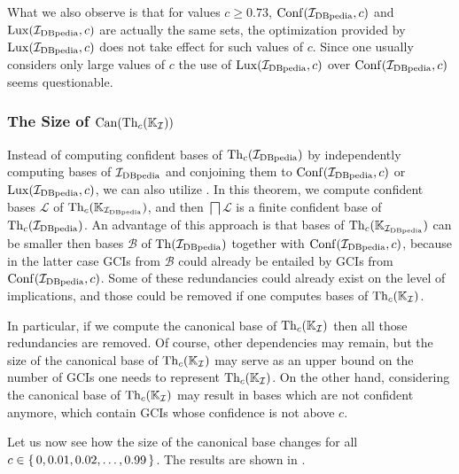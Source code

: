 What we also observe is that for values $c \geq 0.73$, $\operatorname{Conf}({\mathcal{I}_{\text{DBpedia}}}, c)$ and
$\operatorname{Lux}({\mathcal{I}_{\text{DBpedia}}}, c)$ are actually the same sets, \ie the optimization provided by
$\operatorname{Lux}({\mathcal{I}_{\text{DBpedia}}}, c)$ does not take effect for such values of $c$.  Since one usually
considers only large values of $c$ the use of $\operatorname{Lux}({\mathcal{I}_{\text{DBpedia}}}, c)$ over $\operatorname{Conf}({\mathcal{I}_{\text{DBpedia}}},
c)$ seems questionable.

\subsubsection{The Size of $\operatorname{Can}(\operatorname{Th}_c({\mathbb{K}}_{\mathcal{I}}))$}
\label{sec:size-canth_cc-k_math}

Instead of computing confident bases of $\operatorname{Th}_c({\mathcal{I}_{\text{DBpedia}}})$ by independently computing
bases of ${\mathcal{I}_{\text{DBpedia}}}$ and conjoining them to $\operatorname{Conf}({\mathcal{I}_{\text{DBpedia}}}, c)$ or $\operatorname{Lux}({\mathcal{I}_{\text{DBpedia}}}, c)$,
we can also utilize
.  In this theorem,
we compute confident bases $\mathcal{L}$ of $\operatorname{Th}_c({\mathbb{K}}_{{\mathcal{I}_{\text{DBpedia}}}})$, and then
$\bigsqcap \mathcal{L}$ is a finite confident base of $\operatorname{Th}_c({\mathcal{I}_{\text{DBpedia}}})$.  An advantage of
this approach is that bases of $\operatorname{Th}_c({\mathbb{K}}_{{\mathcal{I}_{\text{DBpedia}}}})$ can be smaller then bases
$\mathcal{B}$ of $\operatorname{Th}({\mathcal{I}_{\text{DBpedia}}})$ together with $\operatorname{Conf}({\mathcal{I}_{\text{DBpedia}}}, c)$, because in the
latter case GCIs from $\mathcal{B}$ could already be entailed by GCIs from
$\operatorname{Conf}({\mathcal{I}_{\text{DBpedia}}}, c)$.  Some of these redundancies could already exist on the level of
implications, and those could be removed if one computes bases of $\operatorname{Th}_c({\mathbb{K}}_{\mathcal{I}})$.

In particular, if we compute the canonical base of $\operatorname{Th}_c({\mathbb{K}}_{\mathcal{I}})$ then all
those redundancies are removed.  Of course, other dependencies may remain, but the size of
the canonical base of $\operatorname{Th}_c({\mathbb{K}}_{\mathcal{I}})$ may serve as an upper bound on the
number of GCIs one needs to represent $\operatorname{Th}_c({\mathbb{K}}_{\mathcal{I}})$.  On the other hand,
considering the canonical base of $\operatorname{Th}_c({\mathbb{K}}_{\mathcal{I}})$ may result in bases which
are not confident anymore, \ie which contain GCIs whose confidence is not above $c$.

Let us now see how the size of the canonical base changes for all $c \in {\ensuremath{\{\, 0, 0.01,
  0.02, \dots, 0.99 \,\}}}$.  The results are shown in .

